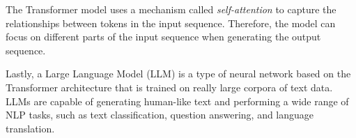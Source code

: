 The Transformer model uses a mechanism called \emph{self-attention} to capture the relationships between tokens in the input sequence. Therefore, the model can focus on different parts of the input sequence when generating the output sequence.

Lastly, a Large Language Model (LLM) is a type of neural network based on the Transformer architecture that is trained on really large corpora of text data. LLMs are capable of generating human-like text and performing a wide range of NLP tasks, such as text classification, question answering, and language translation.